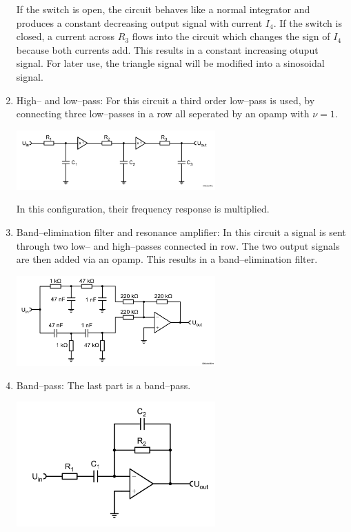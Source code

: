 \documentclass[a4paper,10pt]{article}
\newenvironment{Figure}
        {\par\medskip\noindent\minipage{\linewidth}}
        {\endminipage\par\medskip} %
\numberwithin{equation}{section}
\begin{document}
\begin{multicols}{2}
\begin{enumerate}[label=\arabic*]
		      If the switch is open, the circuit behaves like a normal integrator and produces a constant decreasing output signal with current $I_4$.
		      If the switch is closed, a current across $R_3$ flows into the circuit which changes the sign of $I_4$ because both currents add.
		      This results in a constant increasing otuput signal.
		      For later use, the triangle signal will be modified into a sinosoidal signal.
		\item High-- and low--pass:
		      For this circuit a third order low--pass is used, by connecting three low--passes in a row all seperated by an opamp with $\nu =1$.
		      \begin{Figure}
			      \centering
			      \includegraphics[width=0.6\textwidth]{lowpass_third_order.png}
		      \end{Figure}
		      In this configuration, their frequency response is multiplied.
		\item Band--elimination filter and resonance amplifier:
		      In this circuit a signal is sent through two low-- and high--passes connected in row.
		      The two output signals are then added via an opamp.
		      This results in a band--elimination filter.
		      \begin{Figure}
			      \centering
			      \includegraphics[width=0.6\textwidth]{band_elimination_filter.png}
		      \end{Figure}
		\item Band--pass:
		      The last part is a band--pass.
		      \begin{Figure}
			      \centering
			      \includegraphics[width=0.6\textwidth]{bandpass.png}
		      \end{Figure}
	\end{enumerate}


\end{multicols}
\end{document}
